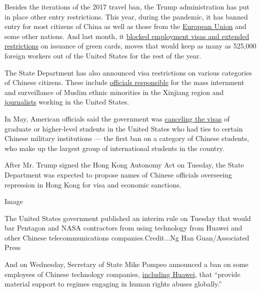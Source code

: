 Besides the iterations of the 2017 travel ban, the Trump administration
has put in place other entry restrictions. This year, during the
pandemic, it has banned entry for most citizens of China as well as
those from the
\href{https://www.nytimes.com/2020/06/23/world/europe/coronavirus-EU-American-travel-ban.html}{European
Union} and some other nations. And last month, it
\href{https://www.nytimes.com/2020/06/22/us/politics/trump-h1b-work-visas.html}{blocked
employment visas and extended restrictions} on issuance of green cards,
moves that would keep as many as 525,000 foreign workers out of the
United States for the rest of the year.

The State Department has also announced visa restrictions on various
categories of Chinese citizens. These include
\href{https://www.nytimes.com/2019/10/08/business/china-human-rights-technology-xinjiang.html}{officials
responsible} for the mass internment and surveillance of Muslim ethnic
minorities in the Xinjiang region and
\href{https://www.nytimes.com/2020/03/17/business/media/china-expels-american-journalists.html}{journalists}
working in the United States.

In May, American officials said the government was
\href{https://www.nytimes.com/2020/05/28/us/politics/china-hong-kong-trump-student-visas.html}{canceling
the visas} of graduate or higher-level students in the United States who
had ties to certain Chinese military institutions --- the first ban on a
category of Chinese students, who make up the largest group of
international students in the country.

After Mr. Trump signed the Hong Kong Autonomy Act on Tuesday, the State
Department was expected to propose names of Chinese officials overseeing
repression in Hong Kong for visa and economic sanctions.

Image

The United States government published an interim rule on Tuesday that
would bar Pentagon and NASA contractors from using technology from
Huawei and other Chinese telecommunications companies.Credit...Ng Han
Guan/Associated Press

And on Wednesday, Secretary of State Mike Pompeo announced a ban on some
employees of Chinese technology companies,
\href{https://www.nytimes.com/2020/07/14/business/huawei-uk-5g.html}{including
Huawei}, that ``provide material support to regimes engaging in human
rights abuses globally.''

\href{https://www.nytimes.com/news-event/coronavirus?action=click\&pgtype=Article\&state=default\&region=MAIN_CONTENT_3\&context=storylines_faq}{}

